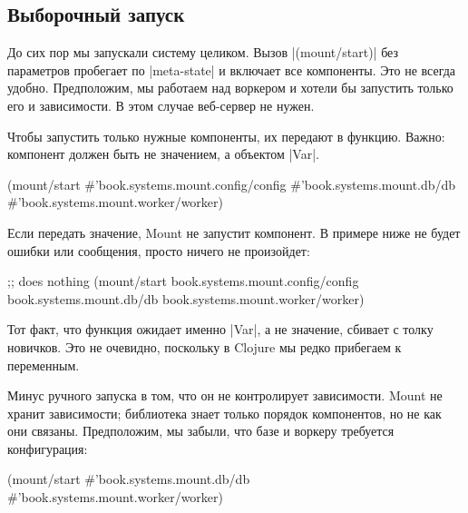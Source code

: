 \subsection{Выборочный запуск}

До сих пор мы запускали систему целиком. Вызов \spverb|(mount/start)| без
параметров пробегает по \spverb|meta-state| и включает все компоненты. Это не
всегда удобно. Предположим, мы работаем над воркером и хотели бы запустить
только его и зависимости. В этом случае веб-сервер не нужен.

Чтобы запустить только нужные компоненты, их передают в функцию. Важно:
компонент должен быть не значением, а объектом \spverb|Var|.


\begin{english}
  \begin{clojure}
(mount/start #'book.systems.mount.config/config
             #'book.systems.mount.db/db
             #'book.systems.mount.worker/worker)
  \end{clojure}
\end{english}

Если передать значение, Mount не запустит компонент. В примере ниже не
будет ошибки или сообщения, просто ничего не произойдет:

\begin{english}
  \begin{clojure}
;; does nothing
(mount/start book.systems.mount.config/config
             book.systems.mount.db/db
             book.systems.mount.worker/worker)
  \end{clojure}
\end{english}

Тот факт, что функция ожидает именно \spverb|Var|, а не значение, сбивает с
толку новичков. Это не очевидно, поскольку в Clojure мы редко прибегаем к
переменным.

Минус ручного запуска в том, что он не контролирует зависимости. Mount
не хранит зависимости; библиотека знает только порядок компонентов, но не как
они связаны. Предположим, мы забыли, что базе и воркеру требуется конфигурация:

\begin{english}
  \begin{clojure}
(mount/start #'book.systems.mount.db/db
             #'book.systems.mount.worker/worker)
  \end{clojure}
\end{english}

